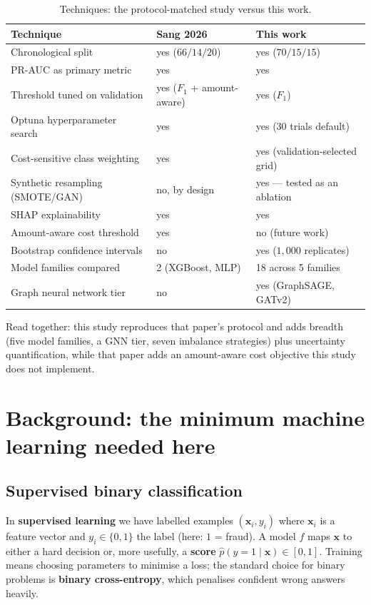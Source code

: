 \documentclass[11pt,a4paper]{article}
\newcommand{\term}[1]{\textbf{\textcolor{accent}{#1}}}
\begin{document}
\begin{table}[h]
      \centering\small
      \caption{Techniques: the protocol-matched study versus this work.}
      \label{tab:techcmp}
      \begin{tabularx}{\textwidth}{Xll}
            \toprule
            Technique & Sang 2026~\cite{eai2026} & This work\\
            \midrule
            Chronological split & yes ($66/14/20$) & yes ($70/15/15$)\\
            PR-AUC as primary metric & yes & yes\\
            Threshold tuned on validation & yes ($F_1$ + amount-aware) & yes ($F_1$)\\
            Optuna hyperparameter search & yes & yes (30 trials default)\\
            Cost-sensitive class weighting & yes & yes (validation-selected grid)\\
            Synthetic resampling (SMOTE/GAN) & no, by design & yes --- tested as an ablation\\
            SHAP explainability & yes & yes\\
            Amount-aware cost threshold & yes & no (future work)\\
            Bootstrap confidence intervals & no & yes ($1{,}000$ replicates)\\
            Model families compared & 2 (XGBoost, MLP) & 18 across 5 families\\
            Graph neural network tier & no & yes (GraphSAGE, GATv2)\\
            \bottomrule
      \end{tabularx}
\end{table}

Read together: this study reproduces that paper's protocol and adds breadth (five model
families, a GNN tier, seven imbalance strategies) plus uncertainty quantification, while that
paper adds an amount-aware cost objective this study does not implement.

\section{Background: the minimum machine learning needed here}

\subsection{Supervised binary classification}
In \term{supervised learning} we have labelled examples
$(\mathbf{x}_i, y_i)$ where $\mathbf{x}_i$ is a feature vector and
$y_i \in \{0, 1\}$ the label (here: $1$ = fraud). A model $f$ maps $\mathbf{x}$
to either a hard decision or, more usefully, a \term{score}
$\hat{p}(y{=}1 \mid \mathbf{x}) \in [0,1]$. Training means choosing parameters to minimise a
loss; the standard choice for binary problems is \term{binary cross-entropy},
which penalises confident wrong answers heavily.
\end{document}
